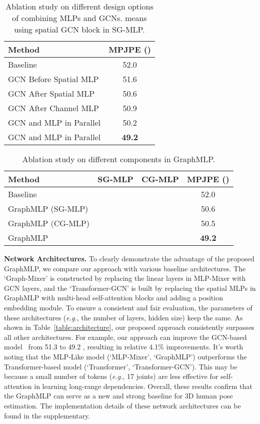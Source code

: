 \documentclass[lettersize,journal]{IEEEtran}
\newcommand{\cmark}{\ding{51}}
\newcommand{\xmark}{\ding{55}}
\begin{document}
\begin{table}[t]
  \centering
  \caption
  {
    Ablation study on different design options of combining MLPs and GCNs. 
     means using spatial GCN block in SG-MLP. 
  }
  \setlength{\tabcolsep}{5.80mm}
  \begin{tabular}{lc}
  \toprule
  Method &MPJPE ()  \\
  \midrule
  Baseline &52.0 \\
  \midrule
  GCN Before Spatial MLP &51.6 \\
  GCN After Spatial MLP &50.6 \\
  GCN After Channel MLP &50.9 \\
  GCN and MLP in Parallel &50.2 \\
  GCN and MLP in Parallel &\textbf{49.2} \\
  \toprule
  \end{tabular}
  \label{table:design}
\end{table}

\begin{table}[t]
  \centering
  \caption
  {
    Ablation study on different components in GraphMLP. 
  }
  \setlength{\tabcolsep}{2.00mm}
  \begin{tabular}{l|cc|c}
  \toprule
  Method& SG-MLP& CG-MLP& MPJPE ()  \\
  \midrule
  Baseline &\xmark &
  \xmark &52.0 \\
  \midrule
  GraphMLP (SG-MLP) &\cmark &\xmark& 50.6 \\
  GraphMLP (CG-MLP) &\xmark &\cmark &50.5 \\
  GraphMLP &\cmark &\cmark &\textbf{49.2} \\

  \toprule
  \end{tabular}
  \label{table:components}
\end{table}

\noindent \textbf{Network Architectures.}
To clearly demonstrate the advantage of the proposed GraphMLP, we compare our approach with various baseline architectures. 
The `Graph-Mixer' is constructed by replacing the linear layers in MLP-Mixer with GCN layers, and the `Transformer-GCN' is built by replacing the spatial MLPs in GraphMLP with multi-head self-attention blocks and adding a position embedding module. 
To ensure a consistent and fair evaluation, the parameters of these architectures (\emph{e.g.}, the number of layers, hidden size) keep the same. 
As shown in Table~\ref{table:architecture}, our proposed approach consistently surpasses all other architectures. 
For example, our approach can improve the GCN-based model~\cite{stgcn} from 51.3  to 49.2 , resulting in relative 4.1\% improvements. 
It's worth noting that the MLP-Like model (`MLP-Mixer', `GraphMLP') outperforms the Transformer-based model (`Transformer', `Transformer-GCN'). 
This may be because a small number of tokens (\emph{e.g.}, 17 joints) are less effective for self-attention in learning long-range dependencies. 
Overall, these results confirm that the GraphMLP can serve as a new and strong baseline for 3D human pose estimation. 
The implementation details of these network architectures can be found in the supplementary. 
\end{document}
